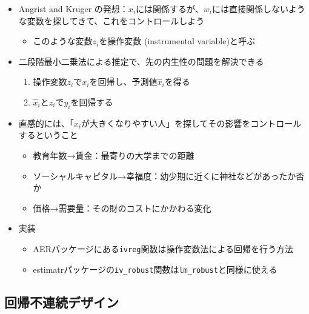 \documentclass[
]{ltjsarticle}
\providecommand{\tightlist}{%
  \setlength{\itemsep}{0pt}\setlength{\parskip}{0pt}}
\begin{document}
\begin{itemize}
\tightlist
\item
  Angrist and Kruger
  の発想：\(x_i\)には関係するが、\(w_i\)には直接関係しないような変数を探してきて、これをコントロールしよう

  \begin{itemize}
  \tightlist
  \item
    このような変数\(z_i\)を操作変数 (instrumental variable)と呼ぶ
  \end{itemize}
\item
  二段階最小二乗法による推定で、先の内生性の問題を解決できる

  \begin{enumerate}
  \def\labelenumi{\arabic{enumi}.}
  \tightlist
  \item
    操作変数\(z_i\)で\(x_i\)を回帰し、予測値\(\hat{x}_i\)を得る
  \item
    \(\hat{x}_i\)と\(z_i\)で\(y_i\)を回帰する
  \end{enumerate}
\item
  直感的には、「\(x_i\)が大きくなりやすい人」を探してその影響をコントロールするということ

  \begin{itemize}
  \tightlist
  \item
    教育年数→賃金：最寄りの大学までの距離
  \item
    ソーシャルキャピタル→幸福度：幼少期に近くに神社などがあったか否か
  \item
    価格→需要量：その財のコストにかかわる変化
  \end{itemize}
\item
  実装

  \begin{itemize}
  \tightlist
  \item
    AERパッケージにある\texttt{ivreg}関数は操作変数法による回帰を行う方法
  \item
    estimatrパッケージの\texttt{iv\_robust}関数は\texttt{lm\_robust}と同様に使える
  \end{itemize}
\end{itemize}

\hypertarget{ux56deux5e30ux4e0dux9023ux7d9aux30c7ux30b6ux30a4ux30f3}{%
\subsection{回帰不連続デザイン}\label{ux56deux5e30ux4e0dux9023ux7d9aux30c7ux30b6ux30a4ux30f3}}
\end{document}
